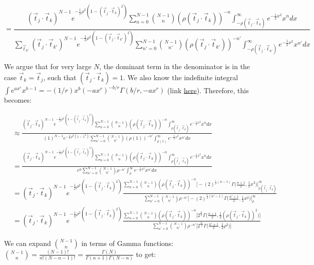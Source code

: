 \documentclass[12pt]{article}
\newcommand{\ptjtk}{\rho(\vec{t}_j\cdot\vec{t}_k)}
\newcommand{\tjtk}{(\vec{t}_j\cdot\vec{t}_k)}
\newcommand{\tjtkk}{(\vec{t}_j\cdot\vec{t}_{k'})}
\newcommand{\ptjtkk}{\rho(\vec{t}_j\cdot\vec{t}_{k'})}
\begin{document}
   \begin{equation}
   =  \frac{ \tjtk^{N-1}e^{-\frac{1}{2}\rho^2(1-\tjtk^2)} \sum_{n=0}^{N-1} \binom{N-1}{n} (\ptjtk)^{-n} \int^{\infty}_{-\ptjtk} e^{-\frac{1}{2}x^2}x^n dx} { \sum_{\vec{t}_{k'}} \tjtkk^{N-1}e^{-\frac{1}{2}\rho^2(1-\tjtkk^2)} \sum_{n'=0}^{N-1} \binom{N-1}{n'} (\ptjtkk)^{-n'} \int^{\infty}_{-\ptjtkk} e^{-\frac{1}{2}x^2}x^{n'} dx}
   \end{equation}

We argue that for very large $N$, the dominant term in the denominator is in the case $\vec{t}_k = \vec{t}_j$, such that $\tjtk = 1$. We also know the indefinite integral $\int e^{ax^r}x^{b-1} = -(1/r) x^b (-ax^r)^{-b/r} \Gamma(b/r,-ax^r)$ (link \href{http://functions.wolfram.com/ElementaryFunctions/Exp/21/01/02/01/01/08/0001/}{here}). Therefore, this becomes:

   \begin{align}
   &\approx  \frac{ \tjtk^{N-1}e^{-\frac{1}{2}\rho^2(1-\tjtk^2)} \sum_{n=0}^{N-1} \binom{N-1}{n} (\ptjtk)^{-n} \int^{\infty}_{\ptjtk} e^{-\frac{1}{2}x^2}x^n dx} 
   { (1)^{N-1}e^{-\frac{1}{2}\rho^2(1-1^2)} \sum_{n'=0}^{N-1} \binom{N-1}{n'} (\rho(1))^{-n'} \int^{\infty}_{\rho(1)} e^{-\frac{1}{2}x^2}x^{n'} dx} \\
   &= \frac{ \tjtk^{N-1}e^{-\frac{1}{2}\rho^2(1-\tjtk^2)} \sum_{n=0}^{N-1} \binom{N-1}{n} (\ptjtk)^{-n} \int^{\infty}_{\ptjtk} e^{-\frac{1}{2}x^2}x^n dx} 
   { e^0\sum_{n'=0}^{N-1} \binom{N-1}{n'} \rho^{-n'} \int^{\infty}_{\rho} e^{-\frac{1}{2}x^2}x^{n'} dx} \\
   &= \tjtk^{N-1}e^{-\frac{1}{2}\rho^2(1-\tjtk^2)} \frac{ \sum_{n=0}^{N-1} \binom{N-1}{n} (\ptjtk)^{-n} \Big[ -(2)^{\frac{1}{2}(n-1)}\Gamma\Big(\frac{n+1}{2},\frac{1}{2}x^2\Big) \Big]^{\infty}_{\ptjtk} } 
   { \sum_{n'=0}^{N-1} \binom{N-1}{n'} \rho^{-n'}  \Big[ -(2)^{\frac{1}{2}(n'-1)}\Gamma\Big(\frac{n'+1}{2},\frac{1}{2}x^2\Big) \Big]^{\infty}_{\rho} } \\
   &= \tjtk^{N-1}e^{-\frac{1}{2}\rho^2(1-\tjtk^2)} \frac{ \sum_{n=0}^{N-1} \binom{N-1}{n} (\ptjtk)^{-n} \Big[ 2^{\frac{n}{2}}\Gamma\Big(\frac{n+1}{2},\frac{1}{2}(\ptjtk)^2\Big) \Big]} 
   { \sum_{n'=0}^{N-1} \binom{N-1}{n'} \rho^{-n'}  \Big[ 2^{\frac{n'}{2}}\Gamma\Big(\frac{n'+1}{2},\frac{1}{2}\rho^2\Big) \Big] }
   \end{align}
   
We can expand $\binom{N-1}{n}$ in terms of Gamma functions: $\binom{N-1}{n} = \frac{(N-1)!}{n!(N-n-1)!} = \frac{\Gamma(N)}{\Gamma(n+1)\Gamma(N-n)}$ to get:%
\end{document}
